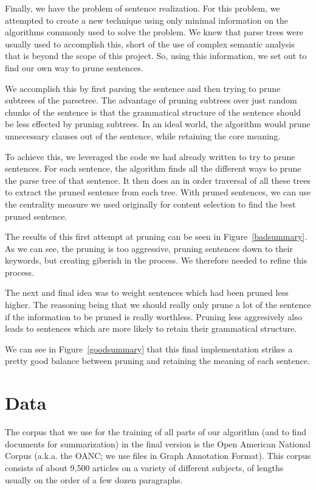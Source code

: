 \documentclass[12pt]{article}
\theoremstyle{plain}
\theoremstyle{definition}
\theoremstyle{remark}
\theoremstyle{plain}
\begin{document}
Finally, we have the problem of sentence realization. For this problem, we attempted to create a new technique using only minimal information on the algorithms commonly used to solve the problem. We knew that parse trees were usually used to accomplish this, short of the use of complex semantic analysis that is beyond the scope of this project. So, using this information, we set out to find our own way to prune sentences. 


We accomplish this by first parsing the sentence and then trying to prune subtrees of the parsetree. The advantage of pruning subtrees over just random chunks of the sentence is that the grammatical structure of the sentence should be less effected by pruning subtrees. In an ideal world, the algorithm would prune unnecessary clauses out of the sentence, while retaining the core meaning.

To achieve this, we leveraged the code we had already written to try to prune sentences. For each sentence, the algorithm finds all the different ways to prune the parse tree of that sentence. It then does an in order traversal of all these trees to extract the pruned sentence from each tree. With pruned sentences, we can use the centrality measure we used originally for content selection to find the best pruned sentence.

The results of this first attempt at pruning can be seen in Figure~\ref{badsummary}. As we can see, the pruning is too aggressive, pruning sentences down to their keywords, but creating giberish in the process. We therefore needed to refine this process.

The next and final idea was to weight sentences which had been pruned less higher. The reasoning being that we should really only prune a lot of the sentence if the information to be pruned is really worthless. Pruning less aggresively also leads to sentences which are more likely to retain their grammatical structure.

We can see in Figure~\ref{goodsummary} that this final implementation strikes a pretty good balance between pruning and retaining the meaning of each sentence.



\section{Data}
	The corpus that we use for the training of all parts of our algorithm (and to find documents for summarization) in the final version is the Open American National Corpus (a.k.a. the OANC; we use files in Graph Annotation Format). This corpus consists of about 9,500 articles on a variety of different subjects, of lengths usually on the order of a few dozen paragraphs. 
	
\end{document}
